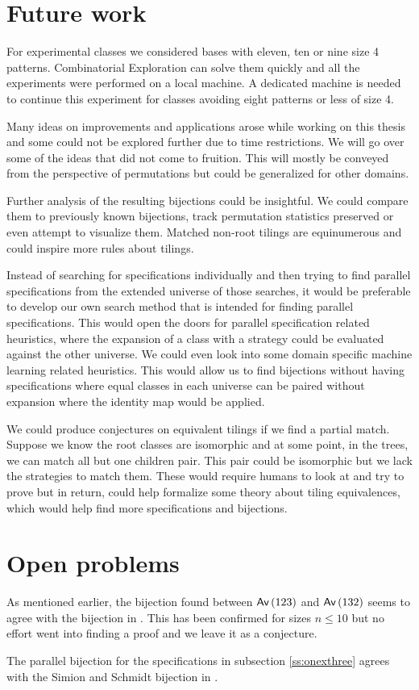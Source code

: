 \label{ch:conclusion}

\section{Future work}\label{s:fw}
For experimental classes we considered bases with eleven, ten or nine size 4 patterns. Combinatorial Exploration can solve them quickly and all the experiments were performed on a local machine. A dedicated machine is needed to continue this experiment for classes avoiding eight patterns or less of size 4.

Many ideas on improvements and applications arose while working on this thesis and some could not be explored further due to time restrictions. We will go over some of the ideas that did not come to fruition. This will mostly be conveyed from the perspective of permutations but could be generalized for other domains.

Further analysis of the resulting bijections could be insightful. We could compare them to previously known bijections, track permutation statistics preserved or even attempt to visualize them. Matched non-root tilings are equinumerous and could inspire more rules about tilings.

Instead of searching for specifications individually and then trying to find parallel specifications from the extended universe of those searches, it would be preferable to develop our own search method that is intended for finding parallel specifications. This would open the doors for parallel specification related heuristics, where the expansion of a class with a strategy could be evaluated against the other universe. We could even look into some domain specific machine learning related heuristics. This would allow us to find bijections without having specifications where equal classes in each universe can be paired without expansion where the identity map would be applied.

We could produce conjectures on equivalent tilings if we find a partial match. Suppose we know the root classes are isomorphic and at some point, in the trees, we can match all but one children pair. This pair could be isomorphic but we lack the strategies to match them. These would require humans to look at and try to prove but in return, could help formalize some theory about tiling equivalences, which would help find more specifications and bijections.

\section{Open problems}
As mentioned earlier, the bijection found between $\textsf{Av}\left(123\right)$ and $\textsf{Av}\left(132\right)$ seems to agree with the \citeauthor{simionandschmidt} bijection in \cite{simionandschmidt}. This has been confirmed for sizes $n \leq 10$ but no effort went into finding a proof and we leave it as a conjecture.
\begin{conjecture}\label{con:ss}
The parallel bijection for the specifications in subsection \ref{ss:onexthree} agrees with the Simion and Schmidt bijection in \cite{simionandschmidt}.
\end{conjecture}

